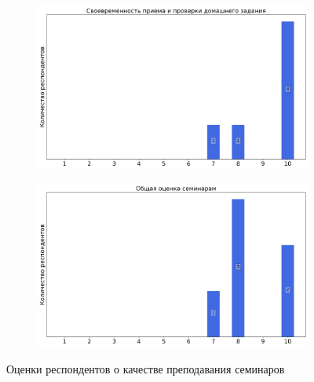 \begin{figure}[H]
\begin{subfigure}[b]{0.45\textwidth}
				\includegraphics[width=\textwidth]{images/2 course/Общая физика - электричество и магнетизм/seminarists-marks-Крымский К.М.-2.png}
			\end{subfigure}
			\begin{subfigure}[b]{0.45\textwidth}
				\centering
				\includegraphics[width=\textwidth]{images/2 course/Общая физика - электричество и магнетизм/seminarists-marks-Крымский К.М.-3.png}
			\end{subfigure}	
			\caption{Оценки респондентов о качестве преподавания семинаров}
		\end{figure}
		
		
